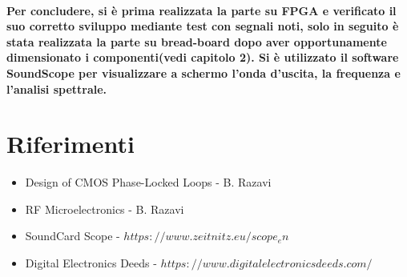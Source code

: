 \documentclass[a4paper]{article}
\begin{document}
\paragraph{Per concludere, si è prima realizzata la parte su FPGA e verificato il suo corretto sviluppo mediante test con segnali noti, solo in seguito è stata realizzata la parte su bread-board dopo aver opportunamente dimensionato i componenti(vedi capitolo 2).
Si è utilizzato il software SoundScope per visualizzare a schermo l'onda d'uscita, la frequenza e l'analisi spettrale.}

\newpage
\section{Riferimenti}
\begin{itemize}
\item Design of CMOS Phase-Locked Loops - B. Razavi
\item RF Microelectronics - B. Razavi
\item SoundCard Scope - $https://www.zeitnitz.eu/scope_en$
\item Digital Electronics Deeds - $https://www.digitalelectronicsdeeds.com/$

\end{itemize}
\end{document}
